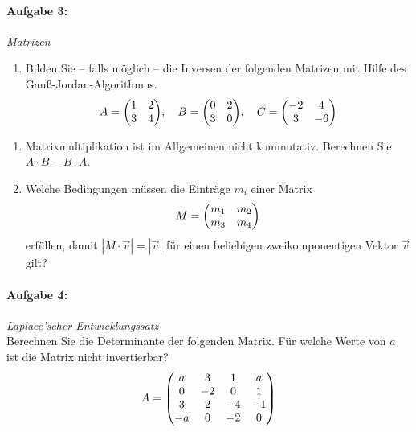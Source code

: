 \paragraph{Aufgabe 3: } \emph{Matrizen}
\begin{enumerate}[label=(\alph*)]
\item Bilden Sie -- falls möglich -- die Inversen der folgenden Matrizen mit Hilfe des Gauß-Jordan-Algorithmus.
\begin{align*}
 A =\mqty(1 & 2\\ 3 & 4),\quad B=\mqty(0 & 2\\ 3 & 0),\quad  C=\mqty(-2 & 4\\ 3 & -6)
\end{align*}
\end{enumerate}
\newpage
\begin{enumerate}[label=(\alph*),resume]
\item Matrixmultiplikation ist im Allgemeinen nicht kommutativ. Berechnen Sie $ A \cdot B- B\cdot A$.
\item Welche Bedingungen müssen die Einträge $m_i$ einer Matrix
\begin{align*}
M = \mqty(m_1 & m_2\\ m_3 & m_4)
\end{align*}
erfüllen, damit $| M\cdot \vec{v}|=|\vec{v}|$ für einen beliebigen zweikomponentigen Vektor $\vec{v}$ gilt? 
\end{enumerate}
%
%
\paragraph{Aufgabe 4: } \emph{Laplace'scher Entwicklungssatz}\\[0.2cm]
Berechnen Sie die Determinante der folgenden Matrix. Für welche Werte von $a$ ist die Matrix nicht invertierbar?
\begin{align*}
A=\mqty(a &3 &1 &a\\ 0 &-2 &0 &1\\ 3 &2 &-4 &-1\\ -a& 0 &-2 &0)
\end{align*}
%
